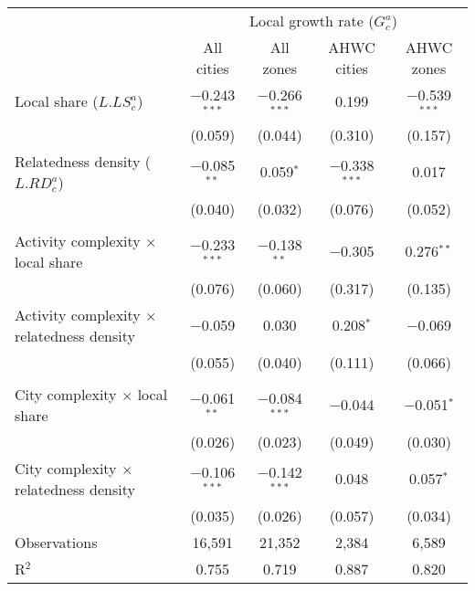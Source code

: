 \begin{tabular}{lcccc}
\toprule
& \multicolumn{4}{c}{Local growth rate ($G_c^a$)} \\
\cmidrule(lr){2-5}
& All cities & All zones & AHWC cities & AHWC zones \\
\midrule
Local share ($L.LS_c^a$) & $-$0.243$^{***}$ & $-$0.266$^{***}$ & 0.199 & $-$0.539$^{***}$ \\
& (0.059) & (0.044) & (0.310) & (0.157) \\
Relatedness density ($L.RD_c^a$) & $-$0.085$^{**}$ & 0.059$^{*}$ & $-$0.338$^{***}$ & 0.017 \\
& (0.040) & (0.032) & (0.076) & (0.052) \\
\\
Activity complexity $\times$ local share & $-$0.233$^{***}$ & $-$0.138$^{**}$ & $-$0.305 & 0.276$^{**}$ \\
& (0.076) & (0.060) & (0.317) & (0.135) \\
Activity complexity $\times$ relatedness density & $-$0.059 & 0.030 & 0.208$^{*}$ & $-$0.069 \\
& (0.055) & (0.040) & (0.111) & (0.066) \\
\\
City complexity $\times$ local share & $-$0.061$^{**}$ & $-$0.084$^{***}$ & $-$0.044 & $-$0.051$^{*}$ \\
& (0.026) & (0.023) & (0.049) & (0.030) \\
City complexity $\times$ relatedness density & $-$0.106$^{***}$ & $-$0.142$^{***}$ & 0.048 & 0.057$^{*}$ \\
& (0.035) & (0.026) & (0.057) & (0.034) \\
\midrule
Observations & 16,591 & 21,352 & 2,384 & 6,589 \\
R$^{2}$ & 0.755 & 0.719 & 0.887 & 0.820 \\
\bottomrule
\end{tabular}
